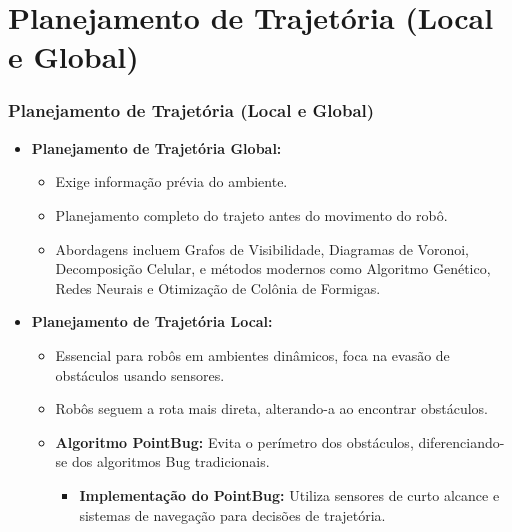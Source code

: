 \documentclass[xcolor=dvipsnames, aspectratio=169]{beamer}
\begin{document}
\section{Planejamento de Trajetória (Local e Global)}
\begin{frame}[fragile]
  \frametitle{Planejamento de Trajetória (Local e Global)}
  \begin{itemize}
    \item \textbf{Planejamento de Trajetória Global:} 
    \begin{itemize}
        \item Exige informação prévia do ambiente.
        \item Planejamento completo do trajeto antes do movimento do robô.
        \item Abordagens incluem Grafos de Visibilidade, Diagramas de Voronoi, Decomposição Celular, e métodos modernos como Algoritmo Genético, Redes Neurais e Otimização de Colônia de Formigas.
    \end{itemize}
    \item \textbf{Planejamento de Trajetória Local:}
    \begin{itemize}
      \item Essencial para robôs em ambientes dinâmicos, foca na evasão de obstáculos usando sensores.
      \item Robôs seguem a rota mais direta, alterando-a ao encontrar obstáculos.
      \item \textbf{Algoritmo PointBug:} Evita o perímetro dos obstáculos, diferenciando-se dos algoritmos Bug tradicionais.
      \begin{itemize}
        \item \textbf{Implementação do PointBug:} Utiliza sensores de curto alcance e sistemas de navegação para decisões de trajetória.
      \end{itemize}
    \end{itemize}
  \end{itemize}

\end{frame}

\end{document}
